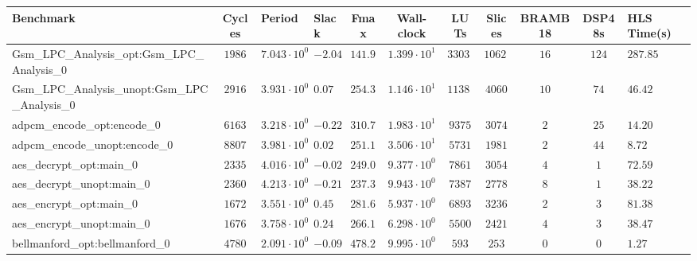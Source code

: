 \begin{tabular}{|l|c|HHc|c|c|c|c|cH|}
\hline
Benchmark                                       & Cycles       & Period                 & Slack     & Fmax       & Wall-clock              & LUTs       & Slices    & BRAMB18 & DSP48s  & HLS Time(s) \\
\hline
Gsm\_LPC\_Analysis\_opt:Gsm\_LPC\_Analysis\_0   & $ 1986     $ & $ 7.043 \cdot 10^{0} $ & $ -2.04 $ & $ 141.98 $ & $ 1.399 \cdot 10^{1}  $ & $ 33032  $ & $ 10627 $ & $ 16  $ & $ 124 $ & $ 287.85  $ \\
Gsm\_LPC\_Analysis\_unopt:Gsm\_LPC\_Analysis\_0 & $ 2916     $ & $ 3.931 \cdot 10^{0} $ & $ 0.07  $ & $ 254.39 $ & $ 1.146 \cdot 10^{1}  $ & $ 11381  $ & $ 4060  $ & $ 10  $ & $ 74  $ & $ 46.42   $ \\
adpcm\_encode\_opt:encode\_0                    & $ 6163     $ & $ 3.218 \cdot 10^{0} $ & $ -0.22 $ & $ 310.75 $ & $ 1.983 \cdot 10^{1}  $ & $ 9375   $ & $ 3074  $ & $ 2   $ & $ 25  $ & $ 14.20   $ \\
adpcm\_encode\_unopt:encode\_0                  & $ 8807     $ & $ 3.981 \cdot 10^{0} $ & $ 0.02  $ & $ 251.19 $ & $ 3.506 \cdot 10^{1}  $ & $ 5731   $ & $ 1981  $ & $ 2   $ & $ 44  $ & $ 8.72    $ \\
aes\_decrypt\_opt:main\_0                       & $ 2335     $ & $ 4.016 \cdot 10^{0} $ & $ -0.02 $ & $ 249.00 $ & $ 9.377 \cdot 10^{0}  $ & $ 7861   $ & $ 3054  $ & $ 4   $ & $ 1   $ & $ 72.59   $ \\
aes\_decrypt\_unopt:main\_0                     & $ 2360     $ & $ 4.213 \cdot 10^{0} $ & $ -0.21 $ & $ 237.36 $ & $ 9.943 \cdot 10^{0}  $ & $ 7387   $ & $ 2778  $ & $ 8   $ & $ 1   $ & $ 38.22   $ \\
aes\_encrypt\_opt:main\_0                       & $ 1672     $ & $ 3.551 \cdot 10^{0} $ & $ 0.45  $ & $ 281.61 $ & $ 5.937 \cdot 10^{0}  $ & $ 6893   $ & $ 3236  $ & $ 2   $ & $ 3   $ & $ 81.38   $ \\
aes\_encrypt\_unopt:main\_0                     & $ 1676     $ & $ 3.758 \cdot 10^{0} $ & $ 0.24  $ & $ 266.10 $ & $ 6.298 \cdot 10^{0}  $ & $ 5500   $ & $ 2421  $ & $ 4   $ & $ 3   $ & $ 38.47   $ \\
bellmanford\_opt:bellmanford\_0                 & $ 4780     $ & $ 2.091 \cdot 10^{0} $ & $ -0.09 $ & $ 478.24 $ & $ 9.995 \cdot 10^{0}  $ & $ 593    $ & $ 253   $ & $ 0   $ & $ 0   $ & $ 1.27    $ \\

\end{tabular}
